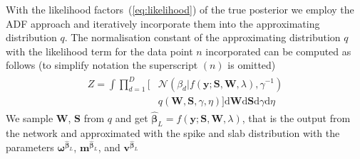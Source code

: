 \documentclass[letterpaper]{article}
\begin{document}
With the likelihood factors~(\ref{eq:likelihood}) of the true posterior we employ the ADF approach and iteratively incorporate them into the approximating distribution $q$. The normalisation constant of the approximating distribution $q$ with the likelihood term for the data point $n$ incorporated can be computed as follows (to simplify notation the superscript $(n)$ is omitted)
\begin{align}
\label{eq:Z}
\begin{split}
Z = \int \prod_{d=1}^{D} \big[&\mathcal{N}(\beta_d | f(\mathbf{y} ; \mathbf{S}, \mathbf{W}, \lambda), \gamma^{-1}) \\
 &q(\mathbf{W}, \mathbf{S}, \gamma, \eta)\big] \mathrm{d}\mathbf{W} \mathrm{d}\mathbf{S} \mathrm{d}\gamma \mathrm{d}\eta
 \end{split}
\end{align}
We sample $\mathbf{W}$, $\mathbf{S}$ from $q$ and get $\widehat{\boldsymbol\beta}_L = f(\mathbf{y} ; \mathbf{S}, \mathbf{W}, \lambda)$, that is the output from the network and approximated with the spike and slab distribution with the parameters $\boldsymbol\omega^{\widehat{\boldsymbol\beta}_L}$, $\mathbf{m}^{\widehat{\boldsymbol\beta}_L}$, and $\mathbf{v}^{\widehat{\boldsymbol\beta}_L}$
\end{document}
